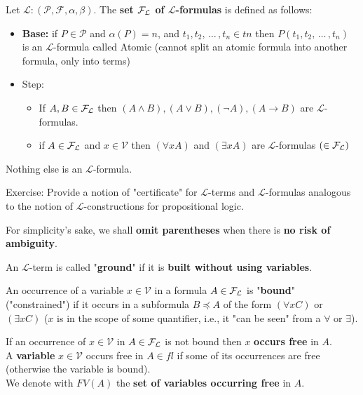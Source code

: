 \begin{definition}
	Let $\mathcal{L}: (\mathcal{P}, \mathcal{F}, \alpha, \beta)$. The \textbf{set $\mathcal{F}_\mathcal{L}$ of $\mathcal{L}$-formulas} is defined as follows: 
	\begin{itemize}
		\item \textbf{Base:} if $P \in \mathcal{P}$ and $\alpha(P) = n$, and $t_1, t_2, \, \dots \, , t_n \in tn$ then $P(t_1, t_2, \, \dots \, , t_n)$ is an $\mathcal{L}$-formula called Atomic (cannot split an atomic formula into another formula, only into terms)
		\item Step:
		\begin{itemize}
			\item If $A,B \in \mathcal{F}_\mathcal{L}$ then $(A \wedge B), (A \vee B), (\neg A), (A \rightarrow B)$ are $\mathcal{L}$-formulas.
			\item if $A \in \mathcal{F}_\mathcal{L}$ and $x \in \mathcal{V}$ then $(\forall x A)$ and $(\exists x A)$ are $\mathcal{L}$-formulas $(\in \mathcal{F}_\mathcal{L})$
		\end{itemize} 
	\end{itemize}
	Nothing else is an $\mathcal{L}$-formula.\\
\end{definition}

Exercise: Provide a notion of "certificate" for $\mathcal{L}$-terms and $\mathcal{L}$-formulas analogous to the notion of $\mathcal{L}$-constructions for propositional logic.\\

\begin{remark}
	For simplicity's sake, we shall \textbf{omit parentheses} when there is \textbf{no risk of ambiguity}.\\
\end{remark}

\begin{terminology}
	An $\mathcal{L}$-term is called "\textbf{ground}" if it is \textbf{built without using variables}.\\
\end{terminology}

\begin{terminology}
	An occurrence of a variable $x \in \mathcal{V}$ in a formula $A \in \mathcal{F}_\mathcal{L}$ is "\textbf{bound}" ("constrained") if it occurs in a subformula $B \preceq A$ of the form $(\forall x C)$ or $(\exists x C)$ ($x$ is in the scope of some quantifier, i.e., it "can be seen" from a $\forall$ or $\exists$).
\end{terminology}

\begin{terminology}
	If an occurrence of $x \in \mathcal{V}$ in $A \in \mathcal{F}_\mathcal{L}$ is not bound then $x$ \textbf{occurs free} in $A$.\\
	A \textbf{variable} $x \in \mathcal{V}$ occurs free in $A \in fl$ if some of its occurrences are free (otherwise the variable is bound).\\
	We denote with $FV(A)$ the \textbf{set of variables occurring free} in $A$.\\
\end{terminology}

